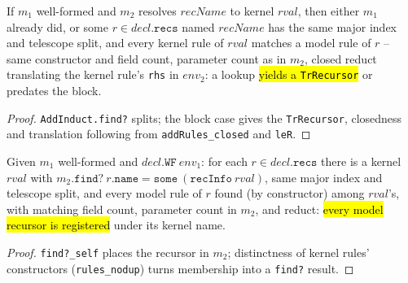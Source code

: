 \begin{theorem}
\label{thm:add-induct-rec-find}
\leanok
{}

 If $m_1$ well-formed and $m_2$ resolves $recName$ to kernel $rval$, then
either $m_1$ already did, or some $r \in decl.\mathtt{recs}$ named $recName$ has the same
major index and telescope split, and every kernel rule of $rval$ matches a model rule of
$r$ -- same constructor and field count, parameter count as in $m_2$, closed reduct
translating the kernel rule's \texttt{rhs} in $env_2$: a lookup \hl{yields a
\texttt{TrRecursor}} or predates the block.
\end{theorem}
\begin{proof}
\leanok
{} \texttt{AddInduct.find?} splits; the block case gives the \texttt{TrRecursor},
closedness and translation following from \texttt{addRules\_closed} and \texttt{leR}.
\end{proof}

\begin{theorem}
\label{thm:add-induct-rec-reg}
\leanok
{}

 Given $m_1$ well-formed and $decl.\mathtt{WF}\ env_1$: for each
$r \in decl.\mathtt{recs}$ there is a kernel $rval$ with
$m_2.\mathtt{find?}\ r.\mathtt{name} = \mathtt{some}\ (\mathtt{recInfo}\ rval)$, same major
index and telescope split, and every model rule of $r$ found (by constructor) among
$rval$'s, with matching field count, parameter count in $m_2$, and reduct: \hl{every model
recursor is registered} under its kernel name.
\end{theorem}
\begin{proof}
\leanok
{} \texttt{find?\_self} places the recursor in $m_2$; distinctness of kernel
rules' constructors (\texttt{rules\_nodup}) turns membership into a \texttt{find?} result.
\end{proof}

